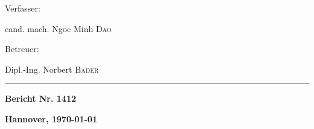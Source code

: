 \vfill

\begin{minipage}[t]{0.5\textwidth}
    \begin{flushleft}
        Verfasser:

        cand. mach. Ngoc Minh \textsc{Dao}
    \end{flushleft}
\end{minipage}
%
\begin{minipage}[t]{0.5\textwidth}
    \begin{flushright}
        Betreuer:

        Dipl.-Ing. Norbert \textsc{Bader}
    \end{flushright}
\end{minipage}

\rule{\textwidth}{1pt}

\begin{minipage}[t]{0.5\textwidth}
    \begin{flushleft}
        \textbf{Bericht Nr. 1412}
    \end{flushleft}
\end{minipage}
%
\begin{minipage}[t]{0.5\textwidth}
    \begin{flushright}
        \textbf{Hannover, \today}
    \end{flushright}
\end{minipage}

